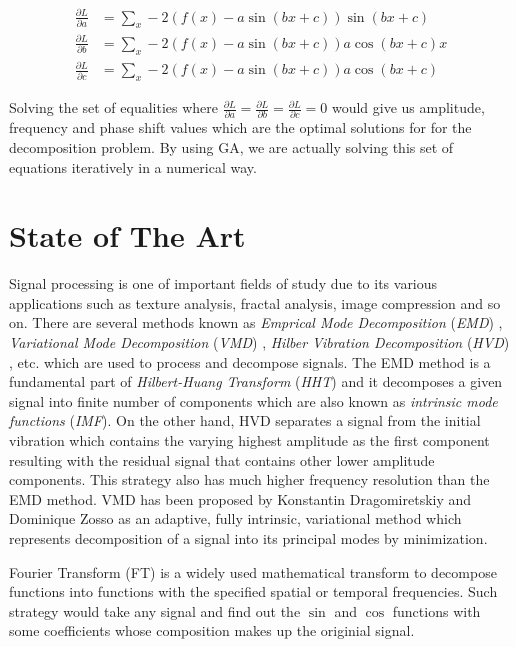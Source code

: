 \documentclass[conference]{IEEEtran}
\begin{document}
\begin{align*}
	\frac{\partial L}{\partial a} &= \sum_{x}^{} -2(f(x)-a\sin(bx+c))\sin(bx+c) \\
	\frac{\partial L}{\partial b} &= \sum_{x}^{} -2(f(x)-a\sin(bx+c))a\cos(bx+c)x \\
	\frac{\partial L}{\partial c} &= \sum_{x}^{} -2(f(x)-a\sin(bx+c))a\cos(bx+c)
	\label{eq:dervs}
\end{align*}

Solving the set of equalities where $\frac{\partial{L}}{\partial{a}} = \frac{\partial{L}}{\partial{b}} = \frac{\partial{L}}{\partial{c}} = 0$ would give us amplitude, frequency and phase shift 
values which are the optimal solutions for for the decomposition problem. By using GA, we are actually solving this set of equations iteratively in a numerical way.

\section{State of The Art}
Signal processing is one of important fields of study due to its various applications such as texture analysis, fractal analysis, image compression and so on. There are several methods known as 
\textit{Emprical Mode Decomposition} (\textit{EMD}) \cite{emd}, \textit{Variational Mode Decomposition} (\textit{VMD}) \cite{vmd}, \textit{Hilber Vibration Decomposition} (\textit{HVD}) \cite{hvd}, 
etc. which are used to process and decompose signals. The EMD method is a fundamental part of \textit{Hilbert-Huang Transform} (\textit{HHT}) and it decomposes a given signal into finite number of 
components which are also known as \textit{intrinsic mode functions} (\textit{IMF}). On the other hand, HVD separates a signal from the initial vibration which contains the varying highest amplitude 
as the first component resulting with the residual signal that contains other lower amplitude components. This strategy also has much higher frequency resolution than the EMD method. VMD has been 
proposed by Konstantin Dragomiretskiy and Dominique Zosso as an adaptive, fully intrinsic, variational method which represents decomposition of a signal into its principal modes by minimization.

Fourier Transform (FT) \cite{ft,ft2} is a widely used mathematical transform to decompose functions into functions with the specified spatial or temporal frequencies. Such strategy would take any signal 
and find out the $\sin$ and $\cos$ functions with some coefficients whose composition makes up the originial signal.
\end{document}
